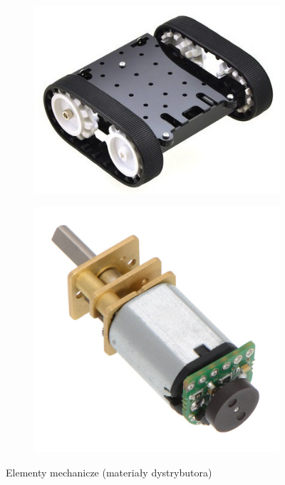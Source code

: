 \documentclass[eng,printmode]{mgr}
\begin{document}
   \begin{figure}[ht]
    \centering
    \begin{subfigure}{.45\textwidth}
     \centering
     \includegraphics[width=1\textwidth]{images/model_mechaniczny}
     \label{fig:model_mechaniczny}
    \end{subfigure}
    \begin{subfigure}{.45\textwidth}
     \centering
     \includegraphics[width=1\textwidth]{images/silnik_enc}
     \label{fig:silnik_enc}
    \end{subfigure}
    \caption{Elementy mechanicze (materiały dystrybutora)}
    \label{fig:plytka}
   \end{figure}
\end{document}

